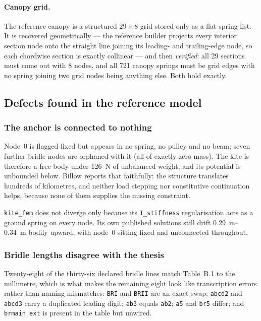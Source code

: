 \documentclass[11pt,a4paper]{article}
\begin{document}
\paragraph{Canopy grid.} The reference canopy is a structured $29\times8$ grid
stored only as a flat spring list. It is recovered geometrically --- the
reference builder projects every interior section node onto the straight line
joining its leading- and trailing-edge node, so each chordwise section is
exactly collinear --- and then \emph{verified}: all 29 sections must come out
with 8 nodes, and all 721 canopy springs must be grid edges with no spring
joining two grid nodes being anything else. Both hold exactly.

\subsection{Defects found in the reference model}

\subsubsection{The anchor is connected to nothing}

Node~0 is flagged fixed but appears in no spring, no pulley and no beam; seven
further bridle nodes are orphaned with it (all of exactly zero mass). The kite
is therefore a free body under \SI{126}{N} of unbalanced weight, and its
potential is unbounded below. Billow reports that faithfully: the structure
translates hundreds of kilometres, and neither load stepping nor constitutive
continuation helps, because none of them supplies the missing constraint.

\texttt{kite\_fem} does not diverge only because its \texttt{I\_stiffness}
regularisation acts as a ground spring on every node. Its own published
solutions still drift \SIrange{0.29}{0.34}{m} bodily upward, with node~0 sitting
fixed and unconnected throughout.

\subsubsection{Bridle lengths disagree with the thesis}

Twenty-eight of the thirty-six declared bridle lines match Table~B.1 to the
millimetre, which is what makes the remaining eight look like transcription
errors rather than naming mismatches: \texttt{BRI} and \texttt{BRII} are an
exact swap; \texttt{abcd2} and \texttt{abcd3} carry a duplicated leading digit;
\texttt{ab3} equals \texttt{ab2}; \texttt{a5} and \texttt{br5} differ; and
\texttt{brmain ext} is present in the table but unwired.
\end{document}
